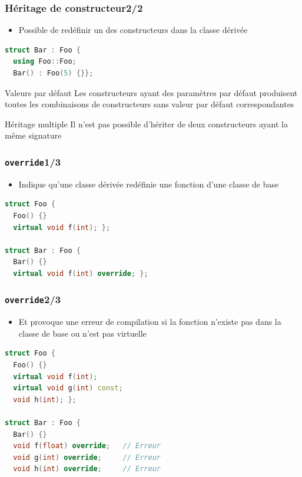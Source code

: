\documentclass[C++.tex]{subfiles}
\begin{document}
\begin{frame}[fragile]
	\frametitle{Héritage de constructeur\titlehfill{}2/2}
	\begin{itemize}
		\item Possible de redéfinir un des constructeurs dans la classe dérivée
	\end{itemize}

	\begin{lstlisting}[language=C++]
struct Bar : Foo {
  using Foo::Foo;
  Bar() : Foo(5) {}};\end{lstlisting}

	\begin{alertblock}{Valeurs par défaut}
		Les constructeurs ayant des paramètres par défaut produisent toutes les combinaisons de constructeurs sans valeur par défaut correspondantes

	\end{alertblock}

	\begin{alertblock}{Héritage multiple}
		Il n'est pas possible d'hériter de deux constructeurs ayant la même signature
	\end{alertblock}

\end{frame}

\begin{frame}[fragile]
	\frametitle{\lstinline|override|\titlehfill{}1/3}
	\begin{itemize}
		\item Indique qu'une classe dérivée redéfinie une fonction d'une classe de base
	\end{itemize}

	\begin{lstlisting}[language=C++]
struct Foo {
  Foo() {}
  virtual void f(int); };

struct Bar : Foo {
  Bar() {}
  virtual void f(int) override; };
\end{lstlisting}
\end{frame}

\begin{frame}[fragile]
	\frametitle{\lstinline|override|\titlehfill{}2/3}
	\begin{itemize}
		\item Et provoque une erreur de compilation si la fonction n'existe pas dans la classe de base ou n'est pas virtuelle
	\end{itemize}

	\begin{lstlisting}[language=C++]
struct Foo {
  Foo() {}
  virtual void f(int); 
  virtual void g(int) const;
  void h(int); };

struct Bar : Foo {
  Bar() {}
  void f(float) override;   // Erreur 
  void g(int) override;     // Erreur
  void h(int) override;     // Erreur\end{lstlisting}
\end{frame}
\end{document}

